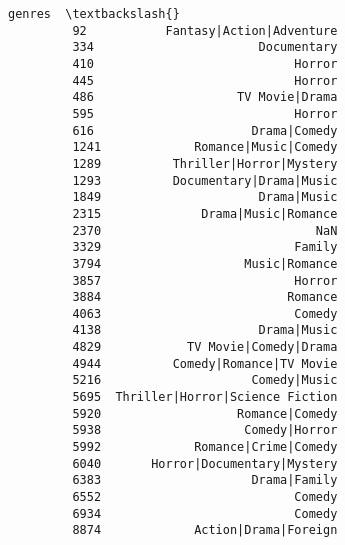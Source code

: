 \documentclass[11pt]{article}
\begin{document}
\begin{Verbatim}[commandchars=\\\{\}]
                                        genres  \textbackslash{}
         92           Fantasy|Action|Adventure   
         334                       Documentary   
         410                            Horror   
         445                            Horror   
         486                    TV Movie|Drama   
         595                            Horror   
         616                      Drama|Comedy   
         1241             Romance|Music|Comedy   
         1289          Thriller|Horror|Mystery   
         1293          Documentary|Drama|Music   
         1849                      Drama|Music   
         2315              Drama|Music|Romance   
         2370                              NaN   
         3329                           Family   
         3794                    Music|Romance   
         3857                           Horror   
         3884                          Romance   
         4063                           Comedy   
         4138                      Drama|Music   
         4829            TV Movie|Comedy|Drama   
         4944          Comedy|Romance|TV Movie   
         5216                     Comedy|Music   
         5695  Thriller|Horror|Science Fiction   
         5920                   Romance|Comedy   
         5938                    Comedy|Horror   
         5992             Romance|Crime|Comedy   
         6040       Horror|Documentary|Mystery   
         6383                     Drama|Family   
         6552                           Comedy   
         6934                           Comedy   
         8874             Action|Drama|Foreign   
         

\end{Verbatim}
\end{document}
